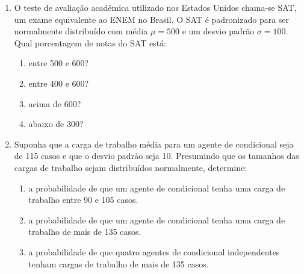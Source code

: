 \documentclass{article}
\begin{document}
\begin{enumerate}
    \item O teste de avaliação acadêmica utilizado nos Estados Unidos chama-se SAT, um exame equivalente ao ENEM no Brasil. O SAT é padronizado para ser normalmente distribuído com média $\mu=500$ e um desvio padrão $\sigma=100$. Qual porcentagem de notas do SAT está:
    \begin{enumerate}
    	\item entre 500 e 600?
    	\item entre 400 e 600?
    	\item acima de 600?
    	\item abaixo de 300?
    \end{enumerate}  



    \item Suponha que a carga de trabalho média para um agente de condicional seja de 115 casos e que o desvio padrão seja 10. Presumindo que os tamanhos das cargas de trabalho sejam distribuídos normalmente, determine:
    \begin{enumerate}
    	\item a probabilidade de que um agente de condicional tenha uma carga de trabalho entre 90 e 105 casos.
    	\item a probabilidade de que um agente de condicional tenha uma carga de trabalho de mais de 135 casos.
    	\item a probabilidade de que quatro agentes de condicional independentes tenham cargas de trabalho de mais de 135 casos.
    \end{enumerate} 


	
		
	
\end{enumerate}
\end{document}
